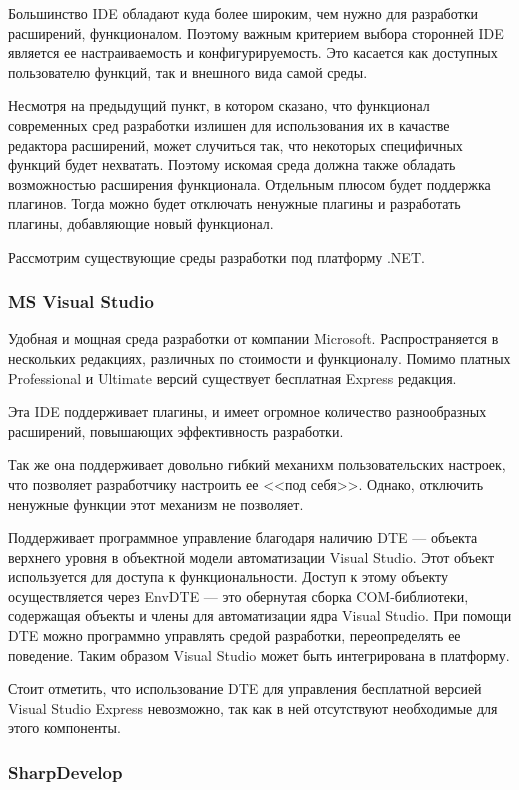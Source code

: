Большинство IDE обладают куда более широким, чем нужно для разработки расширений, функционалом. Поэтому важным критерием выбора сторонней IDE является ее настраиваемость и конфигурируемость. Это касается как доступных пользователю функций, так и внешного вида самой среды.

Несмотря на предыдущий пункт, в котором сказано, что функционал современных сред разработки излишен для использования их в качастве редактора расширений, может случиться так, что некоторых специфичных функций будет нехватать. Поэтому искомая среда должна также обладать возможностью расширения функционала. Отдельным плюсом будет поддержка плагинов. Тогда можно будет отключать ненужные плагины и разработать плагины, добавляющие новый функционал.

Рассмотрим существующие среды разработки под платформу .NET.

\subsubsection{MS Visual Studio}

Удобная и мощная среда разработки от компании Microsoft. Распространяется в нескольких редакциях, различных по стоимости и функционалу. Помимо платных Professional и Ultimate версий существует бесплатная Express редакция.

Эта IDE поддерживает плагины, и имеет огромное количество разнообразных расширений, повышающих эффективность разработки.

Так же она поддерживает довольно гибкий механихм пользовательских настроек, что позволяет разработчику настроить ее <<под себя>>. Однако, отключить ненужные функции этот механизм не позволяет.

Поддерживает программное управление благодаря наличию  DTE --- объекта верхнего уровня в объектной модели автоматизации Visual Studio. Этот объект используется для доступа к функциональности. Доступ к этому объекту осуществляется через EnvDTE — это обернутая сборка COM-библиотеки, содержащая объекты и члены для автоматизации ядра Visual Studio. При помощи DTE можно программно управлять средой разработки, переопределять ее поведение. Таким образом Visual Studio может быть интегрирована в платформу.

Стоит отметить, что использование DTE для управления бесплатной версией Visual Studio Express невозможно, так как в ней отсутствуют необходимые для этого компоненты.

\subsubsection{SharpDevelop}

